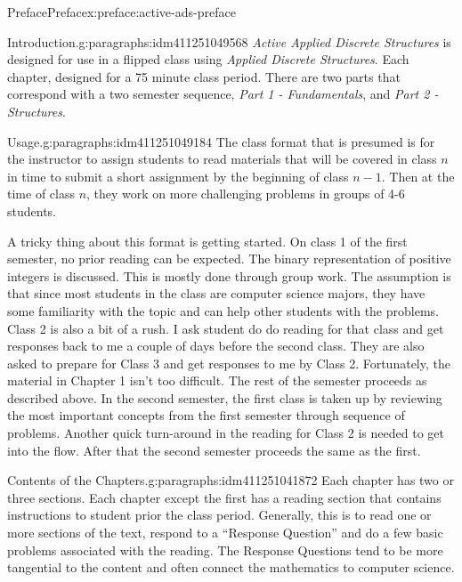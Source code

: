 \documentclass[oneside,10pt,]{book}
\numberwithin{equation}{section}
\begin{document}
\begin{preface}{Preface}{}{Preface}{}{}{x:preface:active-ads-preface}
\begin{paragraphs}{Introduction.}{g:paragraphs:idm411251049568}%
\emph{Active Applied Discrete Structures} is designed for use in a flipped class using \emph{Applied Discrete Structures}. Each chapter, designed for a 75 minute class period.  There are two parts that correspond with a two semester sequence, \emph{Part 1 - Fundamentals}, and \emph{Part 2 - Structures}.%
\end{paragraphs}%
\begin{paragraphs}{Usage.}{g:paragraphs:idm411251049184}%
The class format that is presumed is for the instructor to assign students to read materials that will be covered in class \(n\) in time to submit a short assignment by the beginning of class \(n-1\). Then at the time of class \(n\), they work on more challenging problems in groups of 4-6 students.%
\par
A tricky thing about this format is getting started. On class 1 of the first semester, no prior reading can be expected. The binary representation of positive integers is discussed. This is mostly done through group work. The assumption is that since most students in the class are computer science majors, they have some familiarity with the topic and can help  other students with the problems. Class 2 is also a bit of a rush. I ask student do do reading for that class and get responses back to me a couple of days before the second class. They are also asked to prepare for Class 3 and get responses to me by Class 2.   Fortunately, the material in Chapter 1 isn't too difficult.  The rest of the semester proceeds as described above. In the second semester, the first class is taken up by reviewing the most important concepts from the first semester through sequence of problems. Another quick turn-around in the reading for Class 2 is needed to get into the flow.  After that the second semester proceeds the same as the first.%
\end{paragraphs}%
\begin{paragraphs}{Contents of the Chapters.}{g:paragraphs:idm411251041872}%
Each chapter has two or three sections.  Each chapter except the first has a reading section that contains instructions to student prior the class period. Generally, this is to read one or more sections of the text, respond to a ``Response Question'' and do a few basic problems associated with the reading.  The Response Questions tend to be more tangential to the content and often connect the mathematics to computer science.%

\end{paragraphs}
\end{preface}
\end{document}
